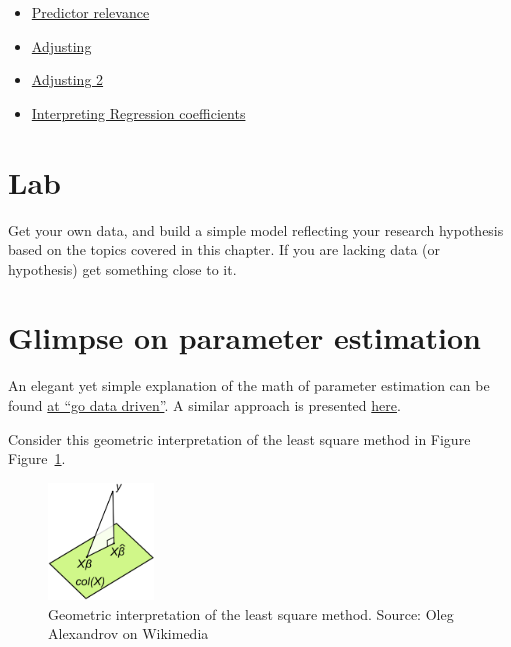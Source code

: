 \documentclass[
  letterpaper,
  DIV=11,
  numbers=noendperiod]{scrreprt}
\providecommand{\tightlist}{%
  \setlength{\itemsep}{0pt}\setlength{\parskip}{0pt}}\usepackage{longtable,booktabs,array}
\theoremstyle{definition}
\theoremstyle{definition}
\theoremstyle{remark}
\begin{document}
\begin{itemize}
\tightlist
\item
  \href{https://datenwerk.netlify.app/posts/log-y-regr3/log-y-regr3/}{Predictor
  relevance}
\item
  \href{https://datenwerk.netlify.app/posts/adjustieren1/adjustieren1/}{Adjusting}
\item
  \href{https://datenwerk.netlify.app/posts/adjustieren2/adjustieren2/}{Adjusting
  2}
\item
  \href{https://datenwerk.netlify.app/posts/interpret-koeff/interpret-koeff/}{Interpreting
  Regression coefficients}
\end{itemize}

\hypertarget{lab-1}{%
\section{Lab}\label{lab-1}}

Get your own data, and build a simple model reflecting your research
hypothesis based on the topics covered in this chapter. If you are
lacking data (or hypothesis) get something close to it.

\hypertarget{glimpse-on-parameter-estimation}{%
\section{Glimpse on parameter
estimation}\label{glimpse-on-parameter-estimation}}

An elegant yet simple explanation of the math of parameter estimation
can be found
\href{https://godatadriven.com/blog/the-linear-algebra-behind-linear-regression/}{at
``go data driven''}. A similar approach is presented
\href{https://shainarace.github.io/LinearAlgebra/leastsquares.html}{here}.

Consider this geometric interpretation of the least square method in
Figure Figure~\ref{fig-leastsq}.

\begin{figure}

{\centering \includegraphics[width=0.25\textwidth,height=\textheight]{./img/543px-Linear_least_squares_geometric_interpretation.png}

}

\caption{\label{fig-leastsq}Geometric interpretation of the least square
method. Source: Oleg Alexandrov on Wikimedia}

\end{figure}
\end{document}
